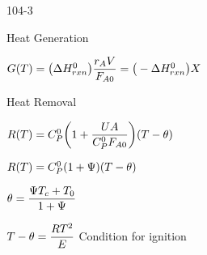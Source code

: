 \begin{mitframe}{104-3}
\begin{listone}
	\item Heat Generation
    \item $\gibbs(\Temp)=\big(\iipf\enthalpy^{\init}_{rxn}\big)\dfrac{\pos_{\helmholtz}\vol}{\force_{\helmholtz\init}}=\big(-\iipf\enthalpy_{rxn}^{\init}\big)X$
    \item Heat Removal
    \item $\gasconst(\Temp)=\cp^{\init}\bigg(1+\dfrac{\uvel\helmholtz}{\cp^{\init}\force_{\helmholtz\init}}\bigg)(\Temp-\theta)$
    \item $\gasconst(\Temp)=\cp^{\init}(1+\streamfunc)(\Temp-\theta)$
    \item $\theta=\dfrac{\streamfunc\Temp_{c}+\Temp_{\init}}{1+\streamfunc}$
    \item $\Temp-\theta=\dfrac{\gasconst\Temp^2}{\energy}$ Condition for ignition
\end{listone}
\end{mitframe}